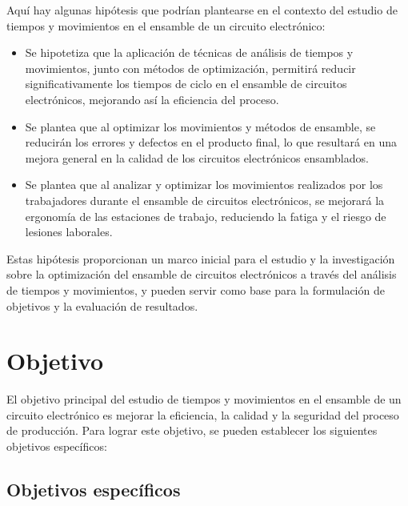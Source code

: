         Aquí hay algunas hipótesis que podrían plantearse en el contexto del estudio de tiempos y movimientos en el ensamble de un circuito electrónico:
        \begin{itemize}
            \item  Se hipotetiza que la aplicación de técnicas de análisis de tiempos y movimientos, junto con métodos de optimización, permitirá reducir significativamente los tiempos de ciclo en el ensamble de circuitos electrónicos, mejorando así la eficiencia del proceso.
            \item Se plantea que al optimizar los movimientos y métodos de ensamble, se reducirán los errores y defectos en el producto final, lo que resultará en una mejora general en la calidad de los circuitos electrónicos ensamblados.
            \item Se plantea que al analizar y optimizar los movimientos realizados por los trabajadores durante el ensamble de circuitos electrónicos, se mejorará la ergonomía de las estaciones de trabajo, reduciendo la fatiga y el riesgo de lesiones laborales.
        \end{itemize}
        Estas hipótesis proporcionan un marco inicial para el estudio y la investigación sobre la optimización del ensamble de circuitos electrónicos a través del análisis de tiempos y movimientos, y pueden servir como base para la formulación de objetivos y la evaluación de resultados.
        \section{Objetivo}
            El objetivo principal del estudio de tiempos y movimientos en el ensamble de un circuito electrónico es mejorar la eficiencia, la calidad y la seguridad del proceso de producción. Para lograr este objetivo, se pueden establecer los siguientes objetivos específicos:
    
        \subsection{Objetivos específicos }
    
